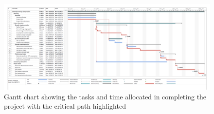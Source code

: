 \documentclass[10pt,twocolumn, a4paper]{witseiepaper}
\begin{document}
\newpage
\begin{landscape}
\begin{figure}[h!]
\renewcommand{\thefigure}{\arabic{figure}}
\centering
\hspace{-1.5cm}
\includegraphics[scale=0.5, frame]{Gantt.png}
\caption{Gantt chart showing the tasks and time allocated in completing the project with the critical path highlighted}
\label{fig: Gantt}
\end{figure}
\end{landscape}
\end{document}
